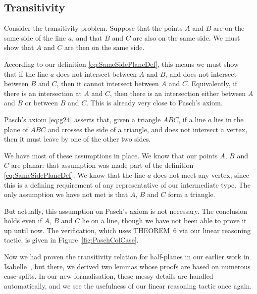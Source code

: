\subsection{Transitivity}
Consider the transitivity problem. Suppose that the points $A$ and $B$ are on the same side of the line $a$, and that $B$ and $C$ are also on the same side. We must show that $A$ and $C$ are then on the same side.

According to our definition \eqref{eq:SameSidePlaneDef}, this means we must show that if the line $a$ does not intersect between $A$ and $B$, and does not intersect between $B$ and $C$, then it cannot intersect between $A$ and $C$. Equivalently, if there is an intersection at $A$ and $C$, then there is an intersection either between $A$ and $B$ or between $B$ and $C$. This is already very close to Pasch's axiom.

Pasch's axiom \eqref{eq:g24} asserts that, given a triangle $ABC$, if a line $a$ lies in the plane of $ABC$ and crosses the side of a triangle, and does not intersect a vertex, then it must leave by one of the other two sides. 

We have most of these assumptions in place. We know that our points $A$, $B$ and $C$ are planar: that assumption was made part of the definition \eqref{eq:SameSidePlaneDef}. We know that the line $a$ does not meet any vertex, since this is a defining requirement of any representative of our intermediate type. The only assumption we have not met is that $A$, $B$ and $C$ form a triangle.

But actually, this assumption on Pasch's axiom is not necessary. The conclusion holds even if $A$, $B$ and $C$ lie on a line, though we have not been able to prove it up until now. The verification, which uses THEOREM~6 via our linear reasoning tactic, is given in Figure~\ref{fig:PaschColCase}. 

Now we had proven the transitivity relation for half-planes in our earlier work in Isabelle~\cite{ScottMScThesis}, but there, we derived two lemmas whose proofs are based on numerous case-splits. In our new formalisation, these messy details are handled automatically, and we see the usefulness of our linear reasoning tactic once again.

